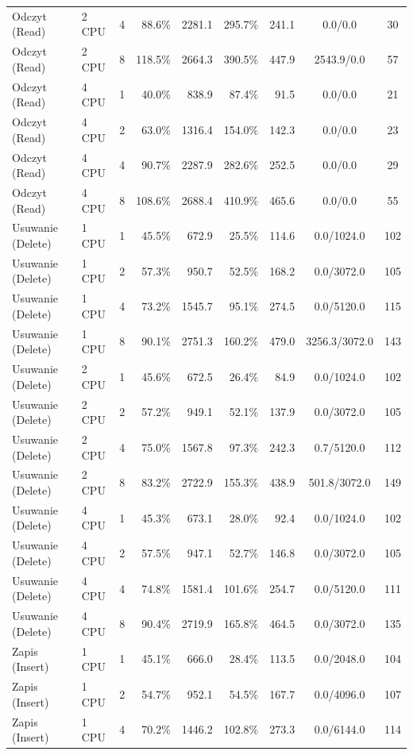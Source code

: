 \begin{table}[ht]
{\begin{tabular}{llcrrrrcc}
Odczyt (Read) & 2 CPU & 4 & 88.6\% & 2281.1 & 295.7\% & 241.1 & 0.0/0.0 & 30 \\
Odczyt (Read) & 2 CPU & 8 & 118.5\% & 2664.3 & 390.5\% & 447.9 & 2543.9/0.0 & 57 \\
Odczyt (Read) & 4 CPU & 1 & 40.0\% & 838.9 & 87.4\% & 91.5 & 0.0/0.0 & 21 \\
Odczyt (Read) & 4 CPU & 2 & 63.0\% & 1316.4 & 154.0\% & 142.3 & 0.0/0.0 & 23 \\
Odczyt (Read) & 4 CPU & 4 & 90.7\% & 2287.9 & 282.6\% & 252.5 & 0.0/0.0 & 29 \\
Odczyt (Read) & 4 CPU & 8 & 108.6\% & 2688.4 & 410.9\% & 465.6 & 0.0/0.0 & 55 \\
Usuwanie (Delete) & 1 CPU & 1 & 45.5\% & 672.9 & 25.5\% & 114.6 & 0.0/1024.0 & 102 \\
Usuwanie (Delete) & 1 CPU & 2 & 57.3\% & 950.7 & 52.5\% & 168.2 & 0.0/3072.0 & 105 \\
Usuwanie (Delete) & 1 CPU & 4 & 73.2\% & 1545.7 & 95.1\% & 274.5 & 0.0/5120.0 & 115 \\
Usuwanie (Delete) & 1 CPU & 8 & 90.1\% & 2751.3 & 160.2\% & 479.0 & 3256.3/3072.0 & 143 \\
Usuwanie (Delete) & 2 CPU & 1 & 45.6\% & 672.5 & 26.4\% & 84.9 & 0.0/1024.0 & 102 \\
Usuwanie (Delete) & 2 CPU & 2 & 57.2\% & 949.1 & 52.1\% & 137.9 & 0.0/3072.0 & 105 \\
Usuwanie (Delete) & 2 CPU & 4 & 75.0\% & 1567.8 & 97.3\% & 242.3 & 0.7/5120.0 & 112 \\
Usuwanie (Delete) & 2 CPU & 8 & 83.2\% & 2722.9 & 155.3\% & 438.9 & 501.8/3072.0 & 149 \\
Usuwanie (Delete) & 4 CPU & 1 & 45.3\% & 673.1 & 28.0\% & 92.4 & 0.0/1024.0 & 102 \\
Usuwanie (Delete) & 4 CPU & 2 & 57.5\% & 947.1 & 52.7\% & 146.8 & 0.0/3072.0 & 105 \\
Usuwanie (Delete) & 4 CPU & 4 & 74.8\% & 1581.4 & 101.6\% & 254.7 & 0.0/5120.0 & 111 \\
Usuwanie (Delete) & 4 CPU & 8 & 90.4\% & 2719.9 & 165.8\% & 464.5 & 0.0/3072.0 & 135 \\
Zapis (Insert) & 1 CPU & 1 & 45.1\% & 666.0 & 28.4\% & 113.5 & 0.0/2048.0 & 104 \\
Zapis (Insert) & 1 CPU & 2 & 54.7\% & 952.1 & 54.5\% & 167.7 & 0.0/4096.0 & 107 \\
Zapis (Insert) & 1 CPU & 4 & 70.2\% & 1446.2 & 102.8\% & 273.3 & 0.0/6144.0 & 114 \\

\end{tabular}}
\end{table}
